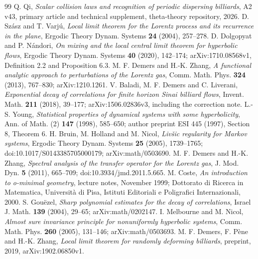 \begin{thebibliography}{99}
 Q. Qi, \emph{Scalar collision laws and recognition of periodic dispersing billiards}, A2 v43, primary article and technical supplement, theta-theory repository, 2026.
 D. Sz\'asz and T. Varj\'u, \emph{Local limit theorem for the Lorentz process and its recurrence in the plane}, Ergodic Theory Dynam. Systems \textbf{24} (2004), 257--278.
 D. Dolgopyat and P. N\'andori, \emph{On mixing and the local central limit theorem for hyperbolic flows}, Ergodic Theory Dynam. Systems \textbf{40} (2020), 142--174; arXiv:1710.08568v1, Definition 2.2 and Proposition 6.3.
 M. F. Demers and H.-K. Zhang, \emph{A functional analytic approach to perturbations of the Lorentz gas}, Comm. Math. Phys. \textbf{324} (2013), 767--830; arXiv:1210.1261.
 V. Baladi, M. F. Demers and C. Liverani, \emph{Exponential decay of correlations for finite horizon Sinai billiard flows}, Invent. Math. \textbf{211} (2018), 39--177; arXiv:1506.02836v3, including the correction note.
 L.-S. Young, \emph{Statistical properties of dynamical systems with some hyperbolicity}, Ann. of Math. (2) \textbf{147} (1998), 585--650; author preprint ESI 445 (1997), Section 8, Theorem 6.
 H. Bruin, M. Holland and M. Nicol, \emph{Liv\v{s}ic regularity for Markov systems}, Ergodic Theory Dynam. Systems \textbf{25} (2005), 1739--1765; doi:10.1017/S0143385705000179; arXiv:math/0503690.
 M. F. Demers and H.-K. Zhang, \emph{Spectral analysis of the transfer operator for the Lorentz gas}, J. Mod. Dyn. \textbf{5} (2011), 665--709; doi:10.3934/jmd.2011.5.665.
 M. Coste, \emph{An introduction to o-minimal geometry}, lecture notes, November 1999; Dottorato di Ricerca in Matematica, Universit\`a di Pisa, Istituti Editoriali e Poligrafici Internazionali, 2000.
 S. Gou\"ezel, \emph{Sharp polynomial estimates for the decay of correlations}, Israel J. Math. \textbf{139} (2004), 29--65; arXiv:math/0202147.
 I. Melbourne and M. Nicol, \emph{Almost sure invariance principle for nonuniformly hyperbolic systems}, Comm. Math. Phys. \textbf{260} (2005), 131--146; arXiv:math/0503693.
 M. F. Demers, F. P\`ene and H.-K. Zhang, \emph{Local limit theorem for randomly deforming billiards}, preprint, 2019, arXiv:1902.06850v1.
\end{thebibliography}

